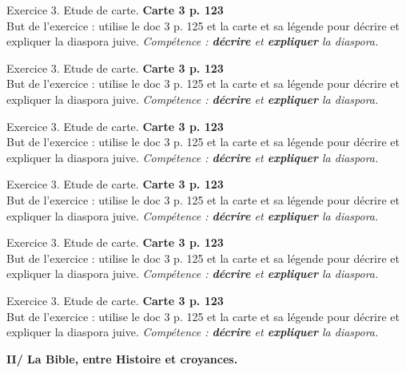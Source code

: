 \documentclass[12pt]{article}
\begin{document}
\vfill

{\large Exercice 3. Etude de carte.} \textbf{Carte 3 p. 123} \\
But de l'exercice : utilise le doc 3 p. 125 et la carte et sa légende pour décrire et expliquer la diaspora juive.
{\small \textit{Compétence : \textbf{décrire} et \textbf{expliquer} la diaspora.}}

\vfill

{\large Exercice 3. Etude de carte.} \textbf{Carte 3 p. 123} \\
But de l'exercice : utilise le doc 3 p. 125 et la carte et sa légende pour décrire et expliquer la diaspora juive.
{\small \textit{Compétence : \textbf{décrire} et \textbf{expliquer} la diaspora.}}

\vfill

{\large Exercice 3. Etude de carte.} \textbf{Carte 3 p. 123} \\
But de l'exercice : utilise le doc 3 p. 125 et la carte et sa légende pour décrire et expliquer la diaspora juive.
{\small \textit{Compétence : \textbf{décrire} et \textbf{expliquer} la diaspora.}}

\vfill

{\large Exercice 3. Etude de carte.} \textbf{Carte 3 p. 123} \\
But de l'exercice : utilise le doc 3 p. 125 et la carte et sa légende pour décrire et expliquer la diaspora juive.
{\small \textit{Compétence : \textbf{décrire} et \textbf{expliquer} la diaspora.}}

\vfill

{\large Exercice 3. Etude de carte.} \textbf{Carte 3 p. 123} \\
But de l'exercice : utilise le doc 3 p. 125 et la carte et sa légende pour décrire et expliquer la diaspora juive.
{\small \textit{Compétence : \textbf{décrire} et \textbf{expliquer} la diaspora.}}

\vfill

{\large Exercice 3. Etude de carte.} \textbf{Carte 3 p. 123} \\
But de l'exercice : utilise le doc 3 p. 125 et la carte et sa légende pour décrire et expliquer la diaspora juive.
{\small \textit{Compétence : \textbf{décrire} et \textbf{expliquer} la diaspora.}}

\vfill

\newpage
\textbf{II/ La Bible, entre Histoire et croyances.}

\vspace{0.5cm}
\end{document}
